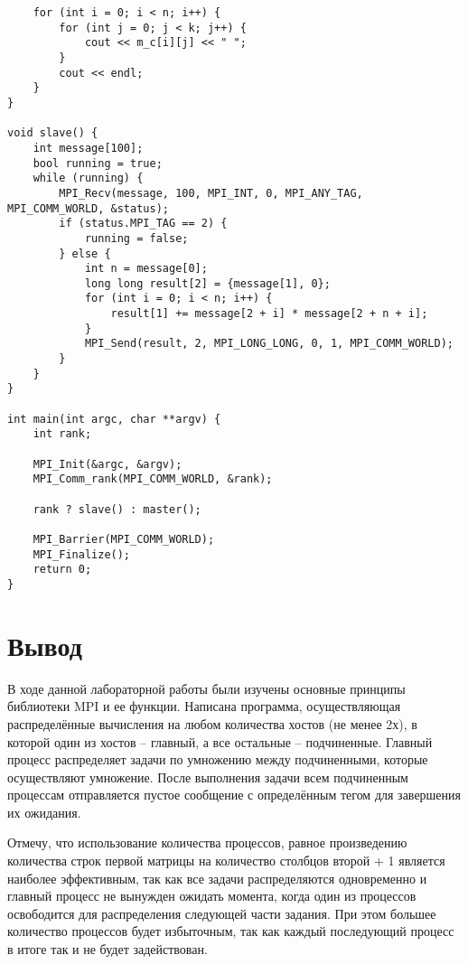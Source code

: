 \documentclass[a4paper,14pt]{extarticle}
\begin{document}
\begin{lstlisting}
    for (int i = 0; i < n; i++) {
        for (int j = 0; j < k; j++) {
            cout << m_c[i][j] << " ";
        }
        cout << endl;
    }
}

void slave() {
    int message[100];
    bool running = true;
    while (running) {
        MPI_Recv(message, 100, MPI_INT, 0, MPI_ANY_TAG, MPI_COMM_WORLD, &status);
        if (status.MPI_TAG == 2) {
            running = false;
        } else {
            int n = message[0];
            long long result[2] = {message[1], 0};
            for (int i = 0; i < n; i++) {
                result[1] += message[2 + i] * message[2 + n + i];
            }
            MPI_Send(result, 2, MPI_LONG_LONG, 0, 1, MPI_COMM_WORLD);
        }
    }
}

int main(int argc, char **argv) {
    int rank;

    MPI_Init(&argc, &argv);
    MPI_Comm_rank(MPI_COMM_WORLD, &rank);

    rank ? slave() : master();

    MPI_Barrier(MPI_COMM_WORLD);
    MPI_Finalize();
    return 0;
}
\end{lstlisting}

\section*{Вывод}
В ходе данной лабораторной работы были изучены основные принципы библиотеки MPI
и ее функции. Написана программа, осуществляющая распределённые вычисления на
любом количества хостов (не менее 2х), в которой один из хостов -- главный, а
все остальные -- подчиненные. Главный процесс распределяет задачи по умножению
между подчиненными, которые осуществляют умножение. После выполнения задачи всем
подчиненным процессам отправляется пустое сообщение с определённым тегом для
завершения их ожидания.

Отмечу, что использование количества процессов, равное произведению количества
строк первой матрицы на количество столбцов второй + 1 является наиболее
эффективным, так как все задачи распределяются одновременно и главный процесс не
вынужден ожидать момента, когда один из процессов освободится для распределения
следующей части задания. При этом большее количество процессов будет избыточным,
так как каждый последующий процесс в итоге так и не будет задействован.
\end{document}
